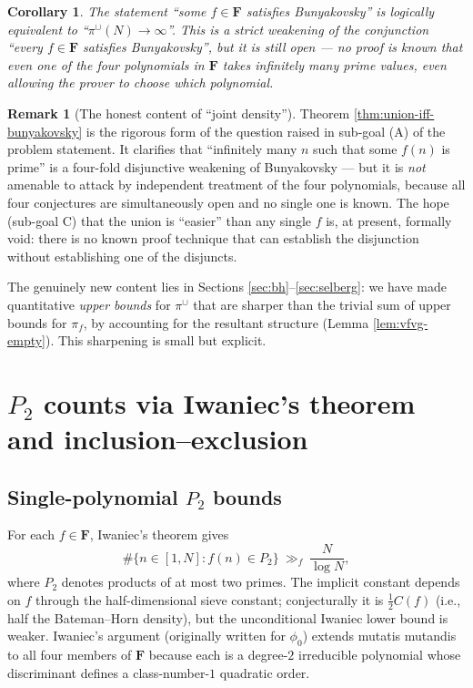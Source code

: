 \documentclass[11pt]{article}
\newtheorem{corollary}[theorem]{Corollary}
\theoremstyle{definition}
\newtheorem{remark}[theorem]{Remark}
\newcommand{\F}{\mathbf{F}}
\newcommand{\F}{\mathcal{F}}
\begin{document}
\begin{corollary}\label{cor:weakening}
The statement ``some $f\in\F$ satisfies Bunyakovsky'' is logically equivalent to ``$\pi^\cup(N)\to\infty$''. This is a strict weakening of the conjunction ``every $f\in\F$ satisfies Bunyakovsky'', but it is still open --- no proof is known that even one of the four polynomials in $\F$ takes infinitely many prime values, even allowing the prover to choose which polynomial.
\end{corollary}

\begin{remark}[The honest content of ``joint density''] Theorem \ref{thm:union-iff-bunyakovsky} is the rigorous form of the question raised in sub-goal (A) of the problem statement. It clarifies that ``infinitely many $n$ such that some $f(n)$ is prime'' is a four-fold disjunctive weakening of Bunyakovsky --- but it is \emph{not} amenable to attack by independent treatment of the four polynomials, because all four conjectures are simultaneously open and no single one is known. The hope (sub-goal C) that the union is ``easier'' than any single $f$ is, at present, formally void: there is no known proof technique that can establish the disjunction without establishing one of the disjuncts.

The genuinely new content lies in Sections \ref{sec:bh}--\ref{sec:selberg}: we have made quantitative \emph{upper bounds} for $\pi^\cup$ that are sharper than the trivial sum of upper bounds for $\pi_f$, by accounting for the resultant structure (Lemma \ref{lem:vfvg-empty}). This sharpening is small but explicit.
\end{remark}

\section{$P_2$ counts via Iwaniec's theorem and inclusion--exclusion}\label{sec:p2}

\subsection{Single-polynomial $P_2$ bounds}

For each $f\in\F$, Iwaniec's theorem \cite{iwaniec1978} gives
\[
\#\{n\in[1,N] : f(n)\in P_2\}\ \gg_f\ \frac{N}{\log N},
\]
where $P_2$ denotes products of at most two primes. The implicit constant depends on $f$ through the half-dimensional sieve constant; conjecturally it is $\frac12 C(f)$ (i.e., half the Bateman--Horn density), but the unconditional Iwaniec lower bound is weaker. Iwaniec's argument (originally written for $\phi_0$) extends mutatis mutandis to all four members of $\F$ because each is a degree-$2$ irreducible polynomial whose discriminant defines a class-number-$1$ quadratic order.
\end{document}
